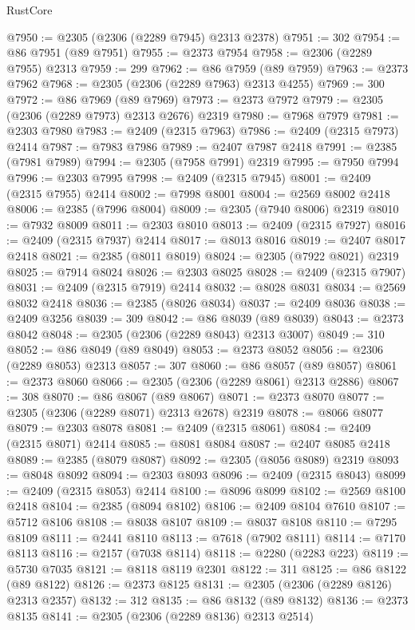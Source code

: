 \begin{lexlean}{RustCore}
\begin{coremodule}
@7950 := @2305 (@2306 (@2289 @7945) @2313 @2378)
@7951 := 302
@7954 := @86 @7951 (@89 @7951)
@7955 := @2373 @7954
@7958 := @2306 (@2289 @7955) @2313
@7959 := 299
@7962 := @86 @7959 (@89 @7959)
@7963 := @2373 @7962
@7968 := @2305 (@2306 (@2289 @7963) @2313 @4255)
@7969 := 300
@7972 := @86 @7969 (@89 @7969)
@7973 := @2373 @7972
@7979 := @2305 (@2306 (@2289 @7973) @2313 @2676) @2319
@7980 := @7968 @7979
@7981 := @2303 @7980
@7983 := @2409 (@2315 @7963)
@7986 := @2409 (@2315 @7973) @2414
@7987 := @7983 @7986
@7989 := @2407 @7987 @2418
@7991 := @2385 (@7981 @7989)
@7994 := @2305 (@7958 @7991) @2319
@7995 := @7950 @7994
@7996 := @2303 @7995
@7998 := @2409 (@2315 @7945)
@8001 := @2409 (@2315 @7955) @2414
@8002 := @7998 @8001
@8004 := @2569 @8002 @2418
@8006 := @2385 (@7996 @8004)
@8009 := @2305 (@7940 @8006) @2319
@8010 := @7932 @8009
@8011 := @2303 @8010
@8013 := @2409 (@2315 @7927)
@8016 := @2409 (@2315 @7937) @2414
@8017 := @8013 @8016
@8019 := @2407 @8017 @2418
@8021 := @2385 (@8011 @8019)
@8024 := @2305 (@7922 @8021) @2319
@8025 := @7914 @8024
@8026 := @2303 @8025
@8028 := @2409 (@2315 @7907)
@8031 := @2409 (@2315 @7919) @2414
@8032 := @8028 @8031
@8034 := @2569 @8032 @2418
@8036 := @2385 (@8026 @8034)
@8037 := @2409 @8036
@8038 := @2409 @3256
@8039 := 309
@8042 := @86 @8039 (@89 @8039)
@8043 := @2373 @8042
@8048 := @2305 (@2306 (@2289 @8043) @2313 @3007)
@8049 := 310
@8052 := @86 @8049 (@89 @8049)
@8053 := @2373 @8052
@8056 := @2306 (@2289 @8053) @2313
@8057 := 307
@8060 := @86 @8057 (@89 @8057)
@8061 := @2373 @8060
@8066 := @2305 (@2306 (@2289 @8061) @2313 @2886)
@8067 := 308
@8070 := @86 @8067 (@89 @8067)
@8071 := @2373 @8070
@8077 := @2305 (@2306 (@2289 @8071) @2313 @2678) @2319
@8078 := @8066 @8077
@8079 := @2303 @8078
@8081 := @2409 (@2315 @8061)
@8084 := @2409 (@2315 @8071) @2414
@8085 := @8081 @8084
@8087 := @2407 @8085 @2418
@8089 := @2385 (@8079 @8087)
@8092 := @2305 (@8056 @8089) @2319
@8093 := @8048 @8092
@8094 := @2303 @8093
@8096 := @2409 (@2315 @8043)
@8099 := @2409 (@2315 @8053) @2414
@8100 := @8096 @8099
@8102 := @2569 @8100 @2418
@8104 := @2385 (@8094 @8102)
@8106 := @2409 @8104 @7610
@8107 := @5712 @8106
@8108 := @8038 @8107
@8109 := @8037 @8108
@8110 := @7295 @8109
@8111 := @2441 @8110
@8113 := @7618 (@7902 @8111)
@8114 := @7170 @8113
@8116 := @2157 (@7038 @8114)
@8118 := @2280 (@2283 @223)
@8119 := @5730 @7035
@8121 := @8118 @8119 @2301
@8122 := 311
@8125 := @86 @8122 (@89 @8122)
@8126 := @2373 @8125
@8131 := @2305 (@2306 (@2289 @8126) @2313 @2357)
@8132 := 312
@8135 := @86 @8132 (@89 @8132)
@8136 := @2373 @8135
@8141 := @2305 (@2306 (@2289 @8136) @2313 @2514)

\end{coremodule}
\end{lexlean}
